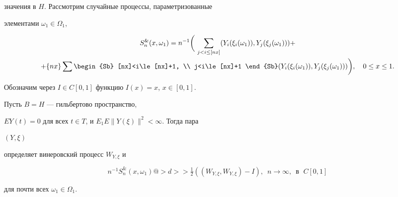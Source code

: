значения в $H$. Рассмотрим случайные процессы, параметризованные 


элементами $\omega_1\in\Omega_1$, 


\begin{multline*} 


S^{\&}_n(x,\omega_1)=n^{-1}\bigg(\, 


\sum_{j<i\le[nx]}(Y_i(\xi_i(\omega_1)),Y_j(\xi_j(\omega_1)))+ \\ 


+\{nx\}\sum\begin{Sb} 


[nx]<i\le[nx]+1, \\ j<i\le[nx]+1 \end{Sb} 


(Y_i(\xi_i(\omega_1)),Y_j(\xi_j(\omega_1)))\bigg),\quad 


0\le x\le 1. 


\end{multline*} 


 


Обозначим через $I\in C[0,1]$ функцию $I(x)=x$, $x\in[0,1]$. 


 


\begin{thm} Пусть $B=H$ --- гильбертово пространство, 


$EY(t)=0$ для всех $t\in T$, и $E_1E\|Y(\xi)\|^2<\infty$. Тогда пара 


$(Y,\xi)$ 


определяет винеровский процесс $W_{Y,\xi}$ и 


$$ 


n^{-1}S^{\&}_n(x,\omega_1)@>d>> \tfrac{1}{2}((W_{Y,\xi}, 


W_{Y,\xi})-I),\ \; n\to\infty,\ \;\text{в }\; C[0,1] 


$$ 


для почти всех $\omega_1\in\Omega_1$. 


\end{thm} 


 


